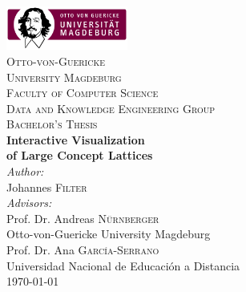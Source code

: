 \begin{titlepage}

\newcommand{\HRule}{\rule{\linewidth}{0.5mm}} %

\center %
 
\includegraphics[width=0.3\textwidth]{./images/logo}\\[0.3cm]

\textsc{\LARGE Otto-von-Guericke}\\[0.2cm] 
\textsc{\LARGE University Magdeburg}\\[0.3cm] 

\textsc{\large Faculty of Computer Science}\\[0.3cm]

\textsc{\normalsize Data and Knowledge Engineering Group}\\[1.5cm]

\textsc{\Large Bachelor's Thesis}\\[1.5cm] %

{ \huge \bfseries Interactive Visualization}\\[0.35cm]
{ \huge \bfseries of Large Concept Lattices}\\[1.5cm]
 

\Large \emph{Author:}\\
Johannes \textsc{Filter}\\[0.5cm]

\Large \emph{Advisors:}\\
Prof. Dr. Andreas \textsc{Nürnberger}\\
{\small Otto-von-Guericke University Magdeburg}\\[0.5cm]

Prof. Dr. Ana \textsc{García-Serrano}\\
{\small Universidad Nacional de Educación a Distancia}\\[1.0cm]


{\large \today}

\vfill %

\end{titlepage}